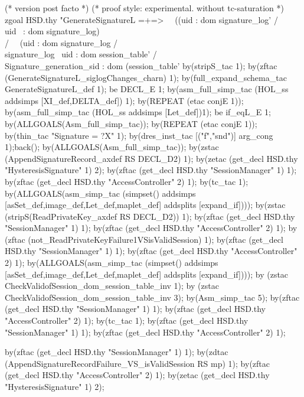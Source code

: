 \documentclass[a4paper,pdftex]{article}
\newenvironment{holz-proof}{\comment}{\endcomment}
\begin{document}
\begin{holz-proof}
(* version post facto *)
(* proof style: experimental. without tc-saturation *)
zgoal HSD.thy
"GenerateSignatureL =+=>                                                        \
\ ((uid : dom signature_log' /\\ uid ~: dom signature_log) \\/                  \
\  (uid : dom signature_log  /\\ signature_log %
\  uid : dom session_table' /\\ Signature_generation_sid : dom (session_table' %
by(stripS_tac 1);
by(zftac (GenerateSignatureL_siglogChanges_charn) 1);
by(full_expand_schema_tac GenerateSignatureL_def 1);
be DECL_E 1;
by(asm_full_simp_tac (HOL_ss addsimps [XI_def,DELTA_def]) 1); 
by(REPEAT (etac conjE 1));
by(asm_full_simp_tac (HOL_ss addsimps [Let_def])1);
be if_eqL_E 1;
by(ALLGOALS(Asm_full_simp_tac));
by(REPEAT (etac conjE 1));
by(thin_tac "Signature = ?X" 1);
by(dres_inst_tac [("f","snd")] arg_cong 1);back();
by(ALLGOALS(Asm_full_simp_tac));
by(zstac (AppendSignatureRecord_axdef RS DECL_D2) 1);
  by(zetac (get_decl HSD.thy "HysteresisSignature" 1) 2);
  by(zftac (get_decl HSD.thy "SessionManager" 1) 1); 
  by(zftac (get_decl HSD.thy "AccessController" 2) 1);
  by(tc_tac 1);
by(ALLGOALS(asm_simp_tac (simpset() addsimps  [asSet_def,image_def,Let_def,maplet_def] 
                                    addsplits [expand_if])));
by(zstac (stripS(ReadPrivateKey_axdef RS DECL_D2)) 1);
  by(zftac (get_decl HSD.thy "SessionManager" 1) 1); 
  by(zftac (get_decl HSD.thy "AccessController" 2) 1);
  by (zftac (not_ReadPrivateKeyFailure1VSisValidSession) 1);
  by(zftac (get_decl HSD.thy "SessionManager" 1) 1); 
  by(zftac (get_decl HSD.thy "AccessController" 2) 1);
by(ALLGOALS(asm_simp_tac (simpset() addsimps  [asSet_def,image_def,Let_def,maplet_def] 
                                    addsplits [expand_if])));
by (zstac CheckValidofSession_dom_session_table_inv 1);
by (zstac CheckValidofSession_dom_session_table_inv 3);
by(Asm_simp_tac 5);
  by(zftac (get_decl HSD.thy "SessionManager" 1) 1); 
  by(zftac (get_decl HSD.thy "AccessController" 2) 1);
  by(tc_tac 1);
  by(zftac (get_decl HSD.thy "SessionManager" 1) 1); 
  by(zftac (get_decl HSD.thy "AccessController" 2) 1);
 
by(zftac (get_decl HSD.thy "SessionManager" 1) 1); 
by(zdtac (AppendSignatureRecordFailure_VS_isValidSession RS mp) 1);
  by(zftac (get_decl HSD.thy "AccessController" 2) 1);
  by(zetac (get_decl HSD.thy "HysteresisSignature" 1) 2);


\end{holz-proof}
\end{document}
